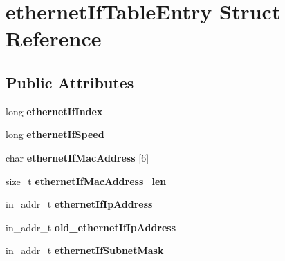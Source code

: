 \hypertarget{structethernetIfTableEntry}{}\section{ethernet\+If\+Table\+Entry Struct Reference}
\label{structethernetIfTableEntry}
\subsection*{Public Attributes}
\begin{DoxyCompactItemize}
\item 
long {\bfseries ethernet\+If\+Index}\hypertarget{structethernetIfTableEntry_aed7013243d605aba821830eab8401063}{}\label{structethernetIfTableEntry_aed7013243d605aba821830eab8401063}

\item 
long {\bfseries ethernet\+If\+Speed}\hypertarget{structethernetIfTableEntry_af6032d9b43132af5f13545984ba99f2a}{}\label{structethernetIfTableEntry_af6032d9b43132af5f13545984ba99f2a}

\item 
char {\bfseries ethernet\+If\+Mac\+Address} \mbox{[}6\mbox{]}\hypertarget{structethernetIfTableEntry_a6bb4e5299a419a754b67e8eff95e8796}{}\label{structethernetIfTableEntry_a6bb4e5299a419a754b67e8eff95e8796}

\item 
size\+\_\+t {\bfseries ethernet\+If\+Mac\+Address\+\_\+len}\hypertarget{structethernetIfTableEntry_a08f1196b7c11b2d4a1b4e0e5bebbece7}{}\label{structethernetIfTableEntry_a08f1196b7c11b2d4a1b4e0e5bebbece7}

\item 
in\+\_\+addr\+\_\+t {\bfseries ethernet\+If\+Ip\+Address}\hypertarget{structethernetIfTableEntry_a5e0c7b92acc3c28f816ee28a5cf4ccff}{}\label{structethernetIfTableEntry_a5e0c7b92acc3c28f816ee28a5cf4ccff}

\item 
in\+\_\+addr\+\_\+t {\bfseries old\+\_\+ethernet\+If\+Ip\+Address}\hypertarget{structethernetIfTableEntry_aa95c2ed19b90fba235d8fb3616b57875}{}\label{structethernetIfTableEntry_aa95c2ed19b90fba235d8fb3616b57875}

\item 
in\+\_\+addr\+\_\+t {\bfseries ethernet\+If\+Subnet\+Mask}\hypertarget{structethernetIfTableEntry_ae7b47a17b5baefb5ee2ac19809b657de}{}\label{structethernetIfTableEntry_ae7b47a17b5baefb5ee2ac19809b657de}


\end{DoxyCompactItemize}
